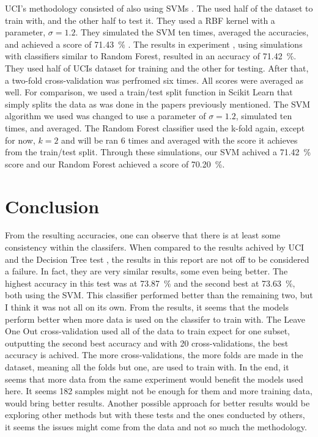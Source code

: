 \documentclass[conference,compsoc]{IEEEtran}
\begin{document}
UCI's methodology consisted of also using SVMs \cite{classsvm}. The used half of the dataset to train with, and the other half to test it. 
They used a RBF kernel with a parameter, $\sigma = 1.2$. They simulated the SVM ten times, averaged the accuracies, and achieved a score of \SI{71.43}{\percent} \cite{classsvm}.
The results in experiment \cite{fuzzy}, using simulations with classifiers similar to Random Forest, resulted in an accuracy of \SI{71.42}{\percent}. They used half of UCIs dataset for 
training and the other for testing. After that, a two-fold cross-validation was perfromed six times. All scores were averaged as well.
For comparison, we used a train/test split function in Scikit Learn that simply splits the data as was done in the papers previously mentioned. The SVM algorithm we used 
was changed to use a parameter of $\sigma = 1.2$, simulated ten times, and averaged. The Random Forest classifier used the k-fold again, except for now, $k = 2$ and will be 
ran 6 times and averaged with the score it achieves from the train/test split. Through these simulations, our SVM achived a \SI{71.42}{\percent} score and our 
Random Forest achieved a score of \SI{70.20}{\percent}.

\section{Conclusion}
From the resulting accuracies, one can observe that there is at least some consistency within the classifers. When compared to the results 
achived by UCI and the Decision Tree test \cite{fuzzy}, the results in this report are not off to be considered a failure. In fact, they are very similar results,
some even being better. The highest accuracy in this test was at \SI{73.87}{\percent} and the second best at \SI{73.63}{\percent}, both using the SVM. 
This classifier performed better than the remaining two, but I think it was not all on its own. From the results, it seems that the models perform better when 
more data is used on the classifer to train with. The Leave One Out cross-validation used all of the data to train expect for one subset, outputting the second 
best accuracy and with 20 cross-validations, the best accuracy is achived. The more cross-validations, the more folds are made in the dataset, meaning all the folds but one, are 
used to train with. In the end, it seems that more data from the same experiment would benefit the models used here. It seems 182 samples might not be enough for them and more training data, would bring better results. 
Another possible approach for better results would be exploring other methods but with these tests and the ones conducted by others, it seems the issues might come from the data and not so much the methodology.




\end{document}
